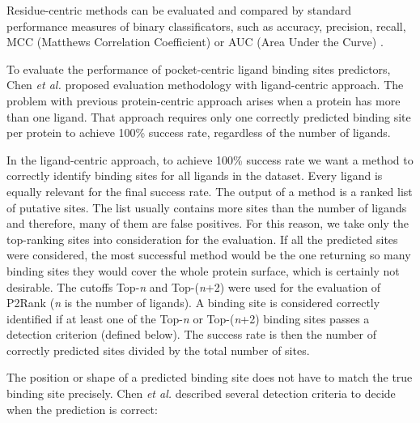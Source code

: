 Residue-centric methods can be evaluated and compared by standard performance measures of binary classificators, such as accuracy, precision, recall, MCC (Matthews Correlation Coefficient) or AUC (Area Under the Curve) \cite{classification}.

To evaluate the performance of pocket-centric ligand binding sites predictors, Chen \textit{et al.} \cite{benchmark} proposed evaluation methodology with ligand-centric approach. The problem with previous protein-centric approach arises when a protein has more than one ligand. That approach requires only one correctly predicted binding site per protein to achieve 100\% success rate, regardless of the number of ligands.

In the ligand-centric approach, to achieve 100\% success rate we want a method to correctly identify binding sites for all ligands in the dataset. Every ligand is equally relevant for the final success rate. The output of a method is a ranked list of putative sites. The list usually contains more sites than the number of ligands and therefore, many of them are false positives. For this reason, we take only the top-ranking sites into consideration for the evaluation. If all the predicted sites were considered, the most successful method would be the one returning so many binding sites they would cover the whole protein surface, which is certainly not desirable. The cutoffs Top-\textit{n} and Top-(\textit{n}+2) were used for the evaluation of P2Rank \cite{p2rank1} (\textit{n} is the number of ligands). A binding site is considered correctly identified if at least one of the Top-\textit{n} or Top-(\textit{n}+2) binding sites passes a detection criterion (defined below). The success rate is then the number of correctly predicted sites divided by the total number of sites.

The position or shape of a predicted binding site does not have to match the true binding site precisely. Chen \textit{et al.} \cite{benchmark} described several detection criteria to decide when the prediction is correct:

